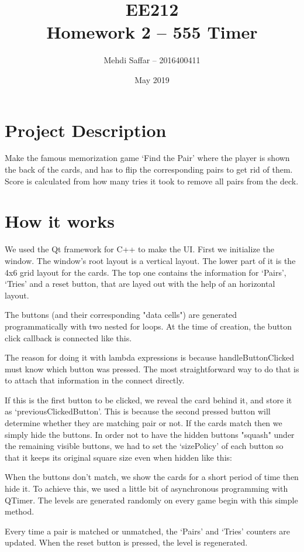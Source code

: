 \documentclass[12pt]{extarticle}
\title{EE212 \\ Homework 2 --  555 Timer}
\author{Mehdi Saffar -- 2016400411}
\date{May 2019}
\begin{document}
\maketitle
\section{Project Description}
Make the famous memorization game `Find the Pair' where the player is shown the back of the cards, and has to flip the corresponding pairs to get rid of them. Score is calculated from how many tries it took to remove all pairs from the deck.
\section{How it works}
We used the Qt framework for C++ to make the UI. First we initialize the window. The window's root layout is a
vertical layout. The lower part of it is the 4x6 grid layout for the cards. The top one contains the information for `Pairs', `Tries' and a reset button, that are layed out with the help of an horizontal layout.

The buttons (and their corresponding "data cells") are generated programmatically with two nested for loops.
At the time of creation, the button click callback is connected like this.

The reason for doing it with lambda expressions is because handleButtonClicked must know which button was pressed. The
most straightforward way to do that is to attach that information in the connect directly.

If this is the first button to be clicked, we reveal the card behind it, and store it as `previousClickedButton'. This is
because the second pressed button will determine whether they are matching pair or not.
If the cards match then we simply hide the buttons. In order not to have the hidden buttons "squash" under the remaining visible buttons,
we had to set the `sizePolicy' of each button so that it keeps its original square size even when hidden like this:

When the buttons don't match, we show the cards for a short period of time then hide it. To achieve this, we used a little
bit of asynchronous programming with QTimer.
The levels are generated randomly on every game begin with this simple method.

Every time a pair is matched or unmatched, the `Pairs' and `Tries' counters are updated.
When the reset button is pressed, the level is regenerated.
\end{document}
